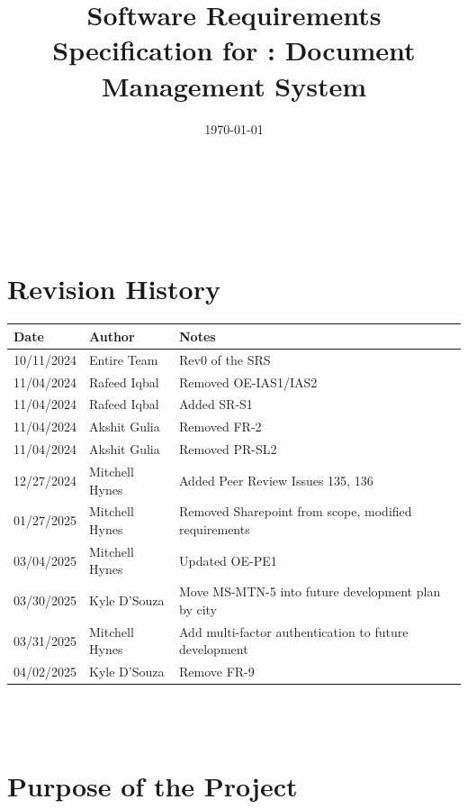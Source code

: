 \documentclass[12pt]{article}
\begin{document}
\title{Software Requirements Specification for \progname: Document
Management System}
\author{\authname}
\date{\today}

\maketitle

~\newpage


\tableofcontents

~\newpage
{}
\section*{Revision History}

\begin{tabularx}{\textwidth}{p{3cm}p{3cm}X}
  \toprule {\textbf{Date}} & {\textbf{Author}} & {\textbf{Notes}}\\
  \midrule
  10/11/2024 & Entire Team & Rev0 of the SRS\\
  11/04/2024 & Rafeed Iqbal & Removed OE-IAS1/IAS2\\
  11/04/2024 & Rafeed Iqbal & Added SR-S1\\
  11/04/2024 & Akshit Gulia & Removed FR-2\\
  11/04/2024 & Akshit Gulia & Removed PR-SL2\\
  12/27/2024 & Mitchell Hynes & Added Peer Review Issues 135, 136\\
  01/27/2025 & Mitchell Hynes & Removed Sharepoint from scope,
  modified requirements\\
  03/04/2025 & Mitchell Hynes & Updated OE-PE1\\
  03/30/2025 & Kyle D'Souza & Move MS-MTN-5 into future development
  plan by city\\
  03/31/2025 & Mitchell Hynes & Add multi-factor authentication to
  future development\\
  04/02/2025 & Kyle D'Souza & Remove FR-9\\
  \bottomrule
\end{tabularx}
~\\

~\newpage
\section{Purpose of the Project}
\end{document}
